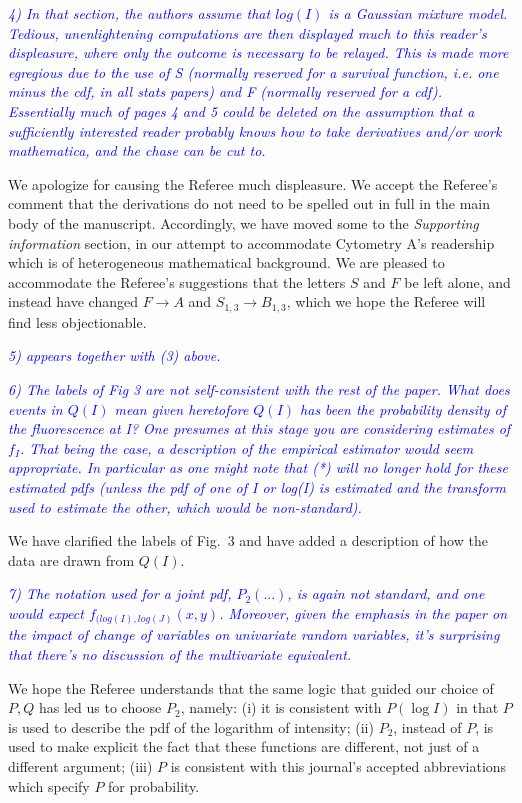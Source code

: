 \documentclass[letter,11pt,draft]{article}
\newcommand{\re}[1]{\emph{\textcolor{blue}{#1}}}
\begin{document}
\re{
4) In that section, the authors assume that $log(I)$ is a Gaussian mixture model. Tedious, unenlightening computations are then displayed much to this reader's displeasure, where only the outcome is necessary to be relayed. This is made more egregious due to the use of S (normally reserved for a survival function, i.e.  one minus the cdf, in all stats papers) and F (normally reserved for a cdf).  Essentially much of pages 4 and 5 could be deleted on the assumption that a sufficiently interested reader probably knows how to take derivatives and/or work mathematica, and the chase can be cut to.
}

\smallskip
We apologize for causing the Referee much displeasure. We accept the Referee's comment that the derivations do not need to be spelled out in full in the main body of the manuscript. Accordingly, we have moved some to the \emph{Supporting information} section, in our attempt to accommodate Cytometry A's readership which is of heterogeneous mathematical background. We are pleased to accommodate the Referee's suggestions that the letters $S$ and $F$ be left alone, and instead have changed $F\rightarrow A$ and $S_{1,3}\rightarrow B_{1,3}$, which we hope the Referee will find less objectionable.

\re{5) appears together with (3) above.}

\smallskip
\re{
6) The labels of Fig 3 are not self-consistent with the rest of the paper. What does events in $Q(I)$ mean given heretofore $Q(I)$ has been the probability density of the fluorescence at I? One presumes at this stage you are considering estimates of $f_I$. That being the case, a description of the empirical estimator would seem appropriate. In particular as one might note that (*) will no longer hold for these estimated pdfs (unless the pdf of one of I or log(I) is estimated and the transform used to estimate the other, which would be non-standard).
}

\smallskip
We have clarified the labels of Fig.~3 and have added a description of how the data are drawn from $Q(I)$.

\re{7) The notation used for a joint pdf, $P_2(...)$, is again not standard, and one would expect $f_{(log(I),log(J)}(x,y)$. Moreover, given the emphasis in the paper on the impact of change of variables on univariate random variables, it's surprising that there's no discussion of the multivariate equivalent.}

\smallskip
We hope the Referee understands that the same logic that guided our choice of $P,Q$ has led us to choose $P_2$, namely: (i) it is consistent with $P(\log I)$ in that $P$ is used to describe the pdf of the logarithm of intensity; (ii) $P_2$, instead of $P$, is used to make explicit the fact that these functions are different, not just of a different argument; (iii) $P$ is consistent with this journal's accepted abbreviations which specify $P$ for probability.
\end{document}

